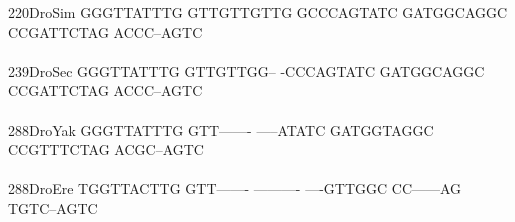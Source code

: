 \documentclass[11pt,twoside,reqno,a4paper]{article}
\begin{document}
{220\hspace*{1\charwidth}DroSim	GGGTTATTTG	GTTGTTGTTG	GCCCAGTATC	GATGGCAGGC	CCGATTCTAG	ACCC--AGTC	\\
\hspace*{4\charwidth}\hspace*{7\charwidth}\hspace*{1\charwidth}\hspace*{1\charwidth}\hspace*{1\charwidth}\hspace*{1\charwidth}\hspace*{1\charwidth}\hspace*{1\charwidth}\\
239\hspace*{1\charwidth}DroSec	GGGTTATTTG	GTTGTTGG--	-CCCAGTATC	GATGGCAGGC	CCGATTCTAG	ACCC--AGTC	\\
\hspace*{4\charwidth}\hspace*{7\charwidth}\hspace*{1\charwidth}\hspace*{1\charwidth}\hspace*{1\charwidth}\hspace*{1\charwidth}\hspace*{1\charwidth}\hspace*{1\charwidth}\\
288\hspace*{1\charwidth}DroYak	GGGTTATTTG	GTT-------	-----ATATC	GATGGTAGGC	CCGTTTCTAG	ACGC--AGTC	\\
\hspace*{4\charwidth}\hspace*{7\charwidth}\hspace*{1\charwidth}\hspace*{1\charwidth}\hspace*{1\charwidth}\hspace*{1\charwidth}\hspace*{1\charwidth}\hspace*{1\charwidth}\\
288\hspace*{1\charwidth}DroEre	TGGTTACTTG	GTT-------	----------	----GTTGGC	CC------AG	TGTC--AGTC	\\
\hspace*{4\charwidth}\hspace*{7\charwidth}\hspace*{1\charwidth}\hspace*{1\charwidth}\hspace*{1\charwidth}\hspace*{1\charwidth}\hspace*{1\charwidth}\hspace*{1\charwidth}\\
}
\end{document}

